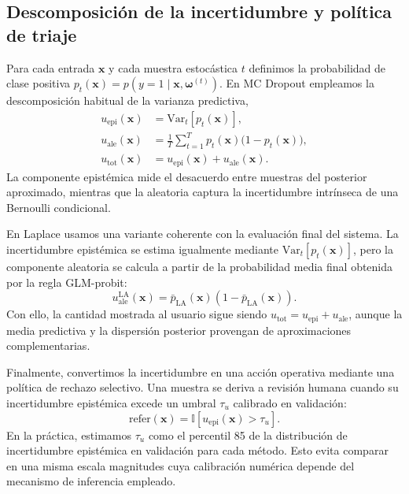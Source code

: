 \documentclass{article}
\begin{document}
\subsection{Descomposici\'on de la incertidumbre y pol\'itica de triaje}
\label{sec:uncertainty-method}

Para cada entrada \(\mathbf{x}\) y cada muestra estoc\'astica \(t\)
definimos la probabilidad de clase positiva
\(p_t(\mathbf{x}) = p(y=1\mid \mathbf{x}, \boldsymbol{\omega}^{(t)})\).
En MC Dropout empleamos la descomposici\'on habitual de la varianza
predictiva,
\begin{align}
u_{\mathrm{epi}}(\mathbf{x})
&=
\mathrm{Var}_{t}\!\left[p_t(\mathbf{x})\right], \label{eq:epi}\\
u_{\mathrm{ale}}(\mathbf{x})
&=
\frac{1}{T}\sum_{t=1}^{T}
p_t(\mathbf{x})\bigl(1-p_t(\mathbf{x})\bigr), \label{eq:ale-mc}\\
u_{\mathrm{tot}}(\mathbf{x})
&=
u_{\mathrm{epi}}(\mathbf{x}) + u_{\mathrm{ale}}(\mathbf{x}).
\label{eq:tot}
\end{align}
La componente epist\'emica mide el desacuerdo entre muestras del
posterior aproximado, mientras que la aleatoria captura la
incertidumbre intr\'inseca de una Bernoulli condicional.

En Laplace usamos una variante coherente con la evaluaci\'on final del
sistema. La incertidumbre epist\'emica se estima igualmente mediante
\(\mathrm{Var}_{t}[p_t(\mathbf{x})]\), pero la componente aleatoria se
calcula a partir de la probabilidad media final obtenida por la regla
GLM-probit:
\begin{equation}
u_{\mathrm{ale}}^{\mathrm{LA}}(\mathbf{x})
=
\bar p_{\mathrm{LA}}(\mathbf{x})
\left(1-\bar p_{\mathrm{LA}}(\mathbf{x})\right).
\label{eq:ale-laplace}
\end{equation}
Con ello, la cantidad mostrada al usuario sigue siendo
\(u_{\mathrm{tot}}=u_{\mathrm{epi}}+u_{\mathrm{ale}}\), aunque la media
predictiva y la dispersi\'on posterior provengan de aproximaciones
complementarias.

Finalmente, convertimos la incertidumbre en una acci\'on operativa
mediante una pol\'itica de rechazo selectivo. Una muestra se deriva a
revisi\'on humana cuando su incertidumbre epist\'emica excede un umbral
\(\tau_u\) calibrado en validaci\'on:
\begin{equation}
\mathrm{refer}(\mathbf{x})
=
\mathbb{I}\!\left[
u_{\mathrm{epi}}(\mathbf{x}) > \tau_u
\right].
\label{eq:triage-rule}
\end{equation}
En la pr\'actica, estimamos \(\tau_u\) como el percentil 85 de la
distribuci\'on de incertidumbre epist\'emica en validaci\'on para cada
m\'etodo. Esto evita comparar en una misma escala magnitudes cuya
calibraci\'on num\'erica depende del mecanismo de inferencia empleado.
\end{document}
